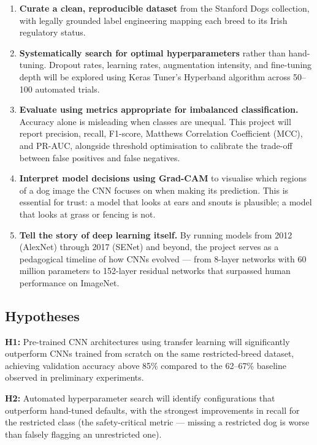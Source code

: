 \begin{enumerate}
    \item \textbf{Curate a clean, reproducible dataset} from the Stanford Dogs collection, with legally grounded label engineering mapping each breed to its Irish regulatory status.

    \item \textbf{Systematically search for optimal hyperparameters} rather than hand-tuning. Dropout rates, learning rates, augmentation intensity, and fine-tuning depth will be explored using Keras Tuner's Hyperband algorithm across 50--100 automated trials.

    \item \textbf{Evaluate using metrics appropriate for imbalanced classification.} Accuracy alone is misleading when classes are unequal. This project will report precision, recall, F1-score, Matthews Correlation Coefficient (MCC), and PR-AUC, alongside threshold optimisation to calibrate the trade-off between false positives and false negatives.

    \item \textbf{Interpret model decisions using Grad-CAM} \citep{selvaraju2017gradcam} to visualise which regions of a dog image the CNN focuses on when making its prediction. This is essential for trust: a model that looks at ears and snouts is plausible; a model that looks at grass or fencing is not.

    \item \textbf{Tell the story of deep learning itself.} By running models from 2012 (AlexNet) through 2017 (SENet) and beyond, the project serves as a pedagogical timeline of how CNNs evolved --- from 8-layer networks with 60 million parameters to 152-layer residual networks that surpassed human performance on ImageNet.
\end{enumerate}

\subsection{Hypotheses}

\textbf{H1:} Pre-trained CNN architectures using transfer learning will significantly outperform CNNs trained from scratch on the same restricted-breed dataset, achieving validation accuracy above 85\% compared to the 62--67\% baseline observed in preliminary experiments.

\textbf{H2:} Automated hyperparameter search will identify configurations that outperform hand-tuned defaults, with the strongest improvements in recall for the restricted class (the safety-critical metric --- missing a restricted dog is worse than falsely flagging an unrestricted one).

